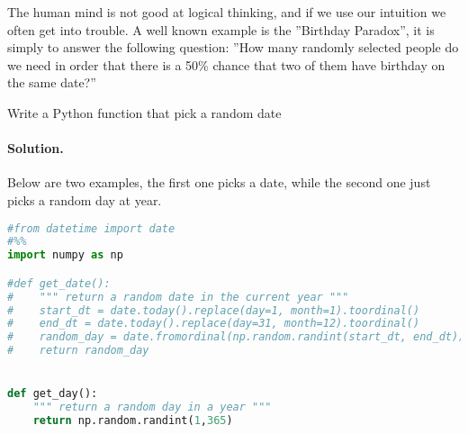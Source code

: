 \documentclass[graybox,sectrefs,envcountresetchap,open=right,final]{svmonodo}
\makeatletter
\newenvironment{doconceexercise}{}{}
\newcounter{doconceexercisecounter}%
\newcommand\listofexercises{
\chapter*{List of Exercises
          \@mkboth{List of Exercises}{List of Exercises}}
\markboth{List of Exercises}{List of Exercises}
\@starttoc{loe}
}
\makeatother
\begin{document}
\begin{doconceexercise}

                             
\label{ex:mc:BP}

The human mind is not good at logical thinking, and if we use our
intuition we often get into trouble. A well known example is the
''Birthday Paradox'', it is simply to answer the following question:
''How many randomly selected people do we need in order that there is
a 50\% chance that two of them have birthday on the same date?'' 



Write a Python function that pick a random date

\paragraph{Solution.}
Below are two examples, the first one picks a date, while the second
one just picks a random day at year.  
















\begin{lstlisting}[language=python,style=blue1]
#from datetime import date
#%%
import numpy as np

#def get_date():
#    """ return a random date in the current year """
#    start_dt = date.today().replace(day=1, month=1).toordinal()
#    end_dt = date.today().replace(day=31, month=12).toordinal()
#    random_day = date.fromordinal(np.random.randint(start_dt, end_dt))
#    return random_day


def get_day():
    """ return a random day in a year """
    return np.random.randint(1,365)

\end{lstlisting}





\end{doconceexercise}
\end{document}
